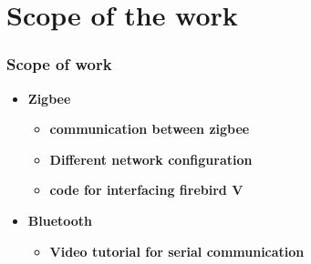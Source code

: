 \documentclass[table,10pt,blue]{beamer}	%
\begin{document}
\section{Scope of the work} %
{
\begin{frame}
	\frametitle{Scope of work}
			\begin{itemize} 
		\item \color{red} \textbf{Zigbee}  \color{black}
		\begin{itemize}\color{blue}
			\item \textbf{communication between zigbee}
			\item \textbf{Different network configuration}
			\item \textbf{code for interfacing firebird V} \color{black}
		\end{itemize}
	\end{itemize}
 	\begin{itemize}
		\item \color{red} \textbf{Bluetooth}  \color{black}
		\begin{itemize}\color{blue}
			\item \textbf{Video tutorial for serial communication}

\end{itemize}
\end{itemize}
\end{frame}}
\end{document}
